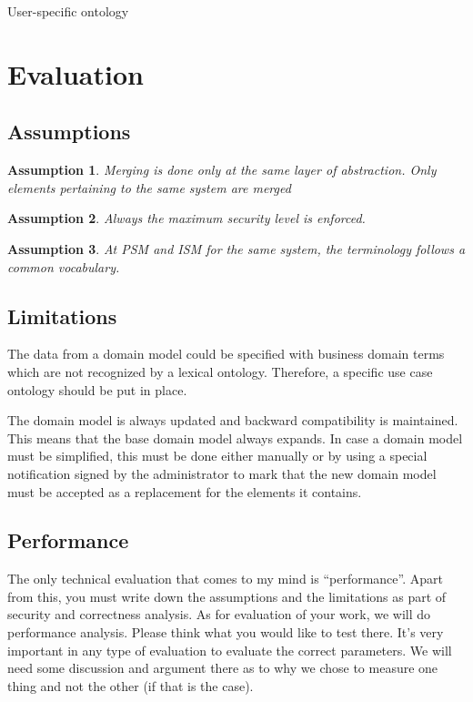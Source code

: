 \documentclass{sig-alternate}
\newtheorem{theorem}{Assumption}
\begin{document}
User-specific ontology

\section{Evaluation}
\subsection{Assumptions}

\begin{theorem}
Merging is done only at the same layer of abstraction. Only elements pertaining to the same system are merged
\label{assumption1}
\end{theorem}

\begin{theorem}
Always the maximum security level is enforced.
\label{assumption2}
\end{theorem}

\begin{theorem}
At PSM and ISM for the same system, the terminology follows a common vocabulary.
\label{assumption3}
\end{theorem}

\subsection{Limitations}
The data from a domain model could be specified with business domain terms which are not recognized by a lexical ontology.
Therefore, a specific use case ontology should be put in place.

The domain model is always updated and backward compatibility is maintained.
This means that the base domain model always expands.
In case a domain model must be simplified, this must be done either manually or
by using a special notification signed by the administrator to mark that the new domain model must be accepted as a replacement
for the elements it contains.

\subsection{Performance}
The only technical evaluation that comes to my mind is “performance”.
Apart from this, you must write down the assumptions and the limitations as part of security and correctness analysis.
As for evaluation of your work, we will do performance analysis. Please think what you would like to test there. 
It’s very important in any type of evaluation to evaluate the correct parameters.
We will need some discussion and argument there as to why we chose to measure one thing and not the other (if that is the case).
\end{document}
